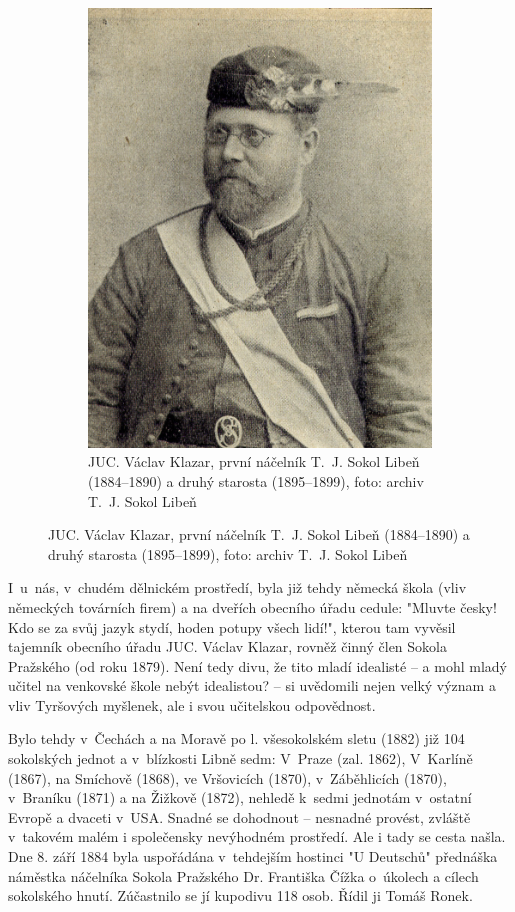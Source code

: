 \documentclass[a5paper, 12pt, twoside]{article}
\begin{document}
\begin{figure}[h]
\begin{subfigure}{0.45\textwidth}
  \includegraphics[width=\textwidth]{img/klazar.jpg}
  \caption*{JUC. Václav Klazar, první náčelník T.~J. Sokol Libeň (1884–⁠⁠⁠⁠⁠⁠1890) a druhý starosta (1895–⁠⁠⁠⁠⁠⁠1899), foto: archiv T.~J. Sokol Libeň}
  \end{subfigure}
\end{figure}

I~u~nás, v~chudém dělnickém prostředí, byla již tehdy německá škola (vliv německých továrních firem) a na dveřích obecního úřadu cedule: "Mluvte česky! Kdo se za svůj jazyk stydí, hoden potupy všech lidí!", kterou tam vyvěsil tajemník obecního úřadu JUC. Václav Klazar, rovněž činný člen Sokola Pražského (od roku 1879). Není tedy divu, že tito mladí idealisté – a mohl mladý učitel na venkovské škole nebýt idealistou? – si uvědomili nejen velký význam a vliv Tyršových myšlenek, ale i svou učitelskou odpovědnost.

Bylo tehdy v~Čechách a na Moravě po l. všesokolském sletu (1882) již 104 sokolských jednot a v~blízkosti Libně sedm: V~Praze (zal. 1862), V~Karlíně (1867), na Smíchově (1868), ve Vršovicích (1870), v~Záběhlicích (1870), v~Braníku (1871) a na Žižkově (1872), nehledě k~sedmi jednotám v~ostatní Evropě a dvaceti v~USA. Snadné se dohodnout – nesnadné provést, zvláště v~takovém malém i společensky nevýhodném prostředí. Ale i tady se cesta našla. Dne 8. září 1884 byla uspořádána v~tehdejším hostinci "U Deutschů" přednáška náměstka náčelníka Sokola Pražského Dr. Františka Čížka o~úkolech a cílech sokolského hnutí. Zúčastnilo se jí kupodivu 118 osob. Řídil ji Tomáš Ronek.
\end{document}
